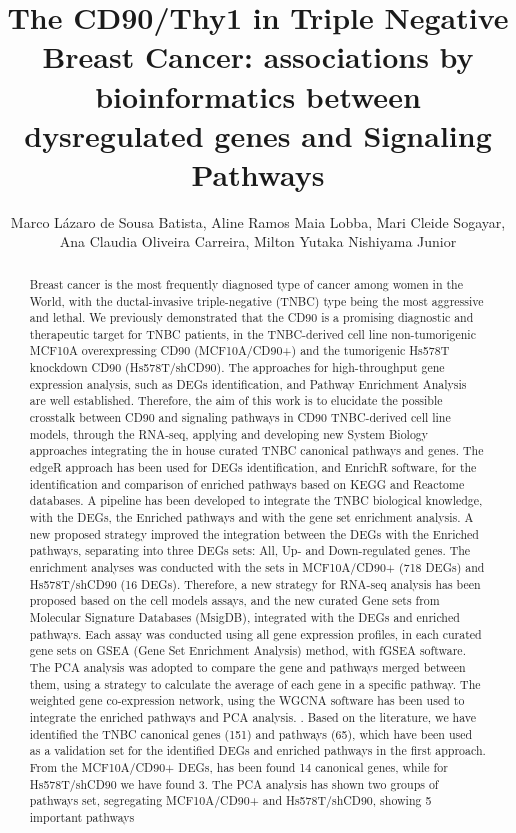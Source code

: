 \documentclass[twoside]{article}
\title{\vspace{-15mm}\fontsize{24pt}{10pt}\selectfont\textbf{ The CD90/Thy1 in Triple Negative Breast Cancer: associations by bioinformatics between dysregulated genes and Signaling Pathways }} %
\author{ Marco L\'azaro de Sousa Batista, Aline Ramos Maia Lobba, Mari Cleide Sogayar, Ana Claudia Oliveira Carreira, Milton Yutaka Nishiyama Junior }
\affil{ NUCEL (Cell and Molecular Therapy Center),  Biochemistry Department,  Chemistry Institute,  University of S\~ao Paulo,  Brazil. }
\date{}
\begin{document}
  
  
  \maketitle %
  
  
  \thispagestyle{fancy} %
  
  
  \begin{abstract}
  Breast cancer is the most frequently diagnosed type of cancer among women in the World,  with the ductal-invasive triple-negative (TNBC) type being the most aggressive and lethal. We previously demonstrated that the CD90 is a promising diagnostic and therapeutic target for TNBC patients,  in the TNBC-derived cell line non-tumorigenic MCF10A overexpressing CD90 (MCF10A/CD90+) and the tumorigenic Hs578T knockdown CD90 (Hs578T/shCD90). The approaches for high-throughput gene expression analysis,  such as DEGs identification,  and Pathway Enrichment Analysis are well established. Therefore,  the aim of this work is to elucidate the possible crosstalk between CD90 and signaling pathways in CD90 TNBC-derived cell line models,  through the RNA-seq,  applying and developing new System Biology approaches integrating the in house curated TNBC canonical pathways and genes. The edgeR approach has been used for DEGs identification,  and EnrichR software,  for the identification and comparison of enriched pathways based on KEGG and Reactome databases. A pipeline has been developed to integrate the TNBC biological knowledge,  with the DEGs,  the Enriched pathways and with the gene set enrichment analysis. A new proposed strategy improved the integration between the DEGs with the Enriched pathways,  separating into three DEGs sets: All,  Up- and Down-regulated genes. The enrichment analyses was conducted with the sets in MCF10A/CD90+ (718 DEGs) and Hs578T/shCD90 (16 DEGs). Therefore,  a new strategy for RNA-seq analysis has been proposed based on the cell models assays,  and the new curated Gene sets from Molecular Signature Databases (MsigDB),  integrated with the DEGs and enriched pathways. Each assay was conducted using all gene expression profiles,  in each curated gene sets on GSEA (Gene Set Enrichment Analysis) method,  with fGSEA software. The PCA analysis was adopted to compare the gene and pathways merged between them,  using a strategy to calculate the average of each gene in a specific pathway. The weighted gene co-expression network,  using the WGCNA software has been used to integrate the enriched pathways and PCA analysis. . Based on the literature,  we have identified the TNBC canonical genes (151) and pathways (65),  which have been used as a validation set for the identified DEGs and enriched pathways in the first approach. From the MCF10A/CD90+ DEGs,  has been found 14 canonical genes,  while for Hs578T/shCD90 we have found 3. The PCA analysis has shown two groups of pathways set,  segregating MCF10A/CD90+ and Hs578T/shCD90,  showing 5 important pathways 
\end{abstract}
\end{document}
